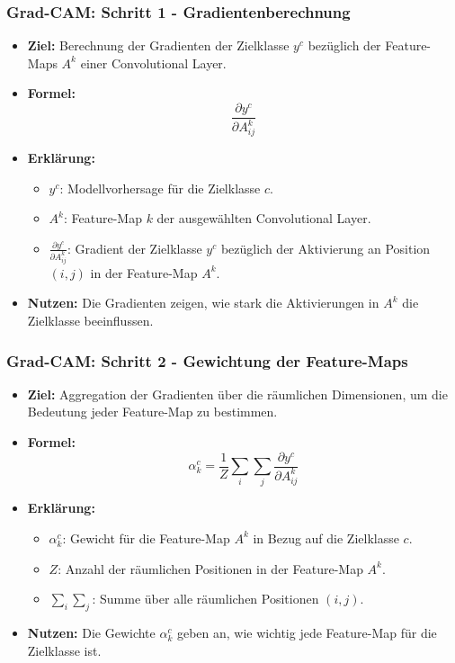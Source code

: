 \documentclass[aspectratio=1610, xcolor=dvipsnames, 9pt]{beamer}
\begin{document}
\begin{frame}
  \frametitle{Grad-CAM: Schritt 1 - Gradientenberechnung}
  \begin{itemize}
    \item \textbf{Ziel:} Berechnung der Gradienten der Zielklasse $y^c$ bezüglich der Feature-Maps $A^k$ einer Convolutional Layer.
    \item \textbf{Formel:}
    \[
    \frac{\partial y^c}{\partial A_{ij}^k}
    \]
    \item \textbf{Erklärung:}
    \begin{itemize}
      \item $y^c$: Modellvorhersage für die Zielklasse $c$.
      \item $A^k$: Feature-Map $k$ der ausgewählten Convolutional Layer.
      \item $\frac{\partial y^c}{\partial A_{ij}^k}$: Gradient der Zielklasse $y^c$ bezüglich der Aktivierung an Position $(i, j)$ in der Feature-Map $A^k$.
    \end{itemize}
    \item \textbf{Nutzen:} Die Gradienten zeigen, wie stark die Aktivierungen in $A^k$ die Zielklasse beeinflussen.
  \end{itemize}
\end{frame}

\begin{frame}
  \frametitle{Grad-CAM: Schritt 2 - Gewichtung der Feature-Maps}
  \begin{itemize}
    \item \textbf{Ziel:} Aggregation der Gradienten über die räumlichen Dimensionen, um die Bedeutung jeder Feature-Map zu bestimmen.
    \item \textbf{Formel:}
    \[
    \alpha_k^c = \frac{1}{Z} \sum_{i} \sum_{j} \frac{\partial y^c}{\partial A_{ij}^k}
    \]
    \item \textbf{Erklärung:}
    \begin{itemize}
      \item $\alpha_k^c$: Gewicht für die Feature-Map $A^k$ in Bezug auf die Zielklasse $c$.
      \item $Z$: Anzahl der räumlichen Positionen in der Feature-Map $A^k$.
      \item $\sum_{i} \sum_{j}$: Summe über alle räumlichen Positionen $(i, j)$.
    \end{itemize}
    \item \textbf{Nutzen:} Die Gewichte $\alpha_k^c$ geben an, wie wichtig jede Feature-Map für die Zielklasse ist.
  \end{itemize}
\end{frame}
\end{document}
